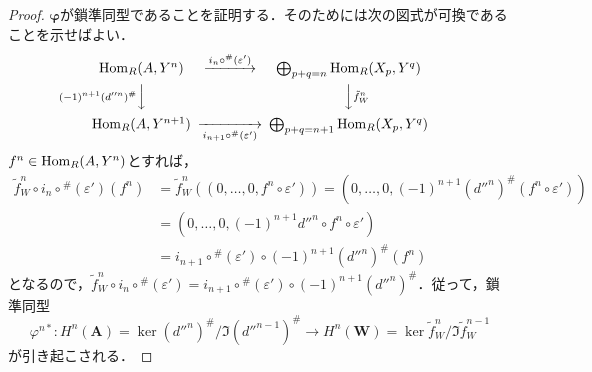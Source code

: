 \begin{proof}
  $\boldsymbol\varphi$が鎖準同型であることを証明する．そのためには次の図式が可換であることを示せばよい．
  \[
  \begin{CD}
    \Hom_R(A, Y^n) @>{i_n \circ{} ^\#(\varepsilon')}>> \bigoplus_{p+q=n}\Hom_R(X_p, Y^q) \\
    @V{(-1)^{n+1}(d''^n)^\#}VV @VV{\tilde{f}_W^n}V \\
    \Hom_R(A, Y^{n+1}) @>>{i_{n+1} \circ{} ^\#(\varepsilon')}> \bigoplus_{p+q=n+1}\Hom_R(X_p, Y^q)
  \end{CD}
  \]
  $f^n \in \operatorname{Hom}_R(A, Y^n)$とすれば，
  \begin{align*}
    \tilde{f}_W^n \circ i_n \circ{} ^\#(\varepsilon') (f^n) & = \tilde{f}_W^n ((0, \ldots, 0, f^n \circ \varepsilon')) = (0, \ldots, 0, (-1)^{n+1}(d''^n)^\#(f^n \circ \varepsilon')) \\
    & = (0, \ldots, 0, (-1)^{n+1} d''^n \circ f^n \circ \varepsilon') \\
    & = i_{n+1} \circ{} ^\#(\varepsilon') \circ (-1)^{n+1}(d''^n)^\# (f^n)
  \end{align*}
  となるので，$\tilde{f}_W^n \circ i_n \circ{} ^\#(\varepsilon') = i_{n+1} \circ{} ^\#(\varepsilon') \circ (-1)^{n+1}(d''^n)^\#$．従って，鎖準同型
  \[ \varphi^{n*} \colon H^n(\boldsymbol{A}) = \ker (d''^n)^\# / \Im (d''^{n-1})^\# \to H^n(\boldsymbol{W}) = \ker \tilde{f}_W^n / \Im \tilde{f}_W^{n-1}  \]
  が引き起こされる．


\end{proof}
